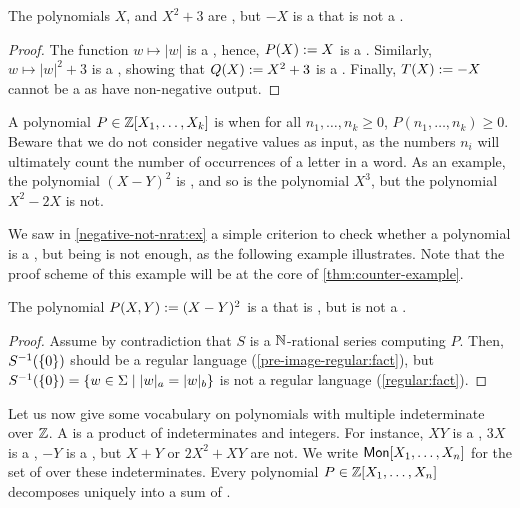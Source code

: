 \begin{example}
    \label{negative-not-nrat:ex}
    The polynomials $X$, and $X^2 + 3$ are ,
    but $- X$ is a  that is 
    not a .
\end{example}
\begin{proof}
    The function $w \mapsto |w|$ is a ,
    hence, $P(X) \mathrel{:=} X$ is
    a . Similarly,
    $w \mapsto |w|^2 + 3$ is a ,
    showing that $Q(X) \mathrel{:=} X^2 + 3$
    is a .
    Finally, 
    $T(X) \mathrel{:=} - X$ cannot be 
    a  as 
    have non-negative output.
\end{proof}

\AP A polynomial $P \in \mathbb{Z}[X_1, \dots, X_k]$ is  when for
all $n_1, \dots, n_k \geq 0$, $P(n_1, \dots, n_k) \geq 0$. Beware that we do
not consider negative values as input, as the numbers $n_i$ will ultimately
count the number of occurrences of a letter in a word. As an example, the
polynomial $(X - Y)^2$ is , and so is the polynomial $X^3$,
but the polynomial $X^2 - 2X$ is not.

We saw in \cref{negative-not-nrat:ex} a simple criterion to check whether a
polynomial is a , but being  is
not enough, as the following example illustrates. Note that the proof scheme of
this example will be at the core of \cref{thm:counter-example}.

\begin{example}
    The polynomial $P(X, Y) \mathrel{:=} (X - Y)^2$
    is a  that is ,
    but is
    not a .
\end{example}
\begin{proof}
    Assume by contradiction that
    $S$ is a $\mathbb{N}$-rational series computing $P$.
    Then, $S^{-1}(\mathopen{\{} 0 \mathclose{\}})$ should be a regular language
    (\cref{pre-image-regular:fact}),
    but $S^{-1}(\set{0}) = \setof{ w \in \Sigma }{ \card[a]{w} = \card[b]{w} }$
    is not a regular language (\cref{regular:fact}).
\end{proof}


\AP Let us now give some vocabulary on polynomials with multiple indeterminate
over $\mathbb{Z}$. A  is a product of indeterminates and integers.
For instance, $XY$ is a , $3 X$ is a , $-Y$ is a
, but $X + Y$ or $2X^2 + XY$ are not. We write $\Monomials[X_1,
\dots, X_n]$ for the set of  over these indeterminates.
Every polynomial $P \in \mathbb{Z}[X_1, \dots, X_n]$ decomposes uniquely
into a sum of .

